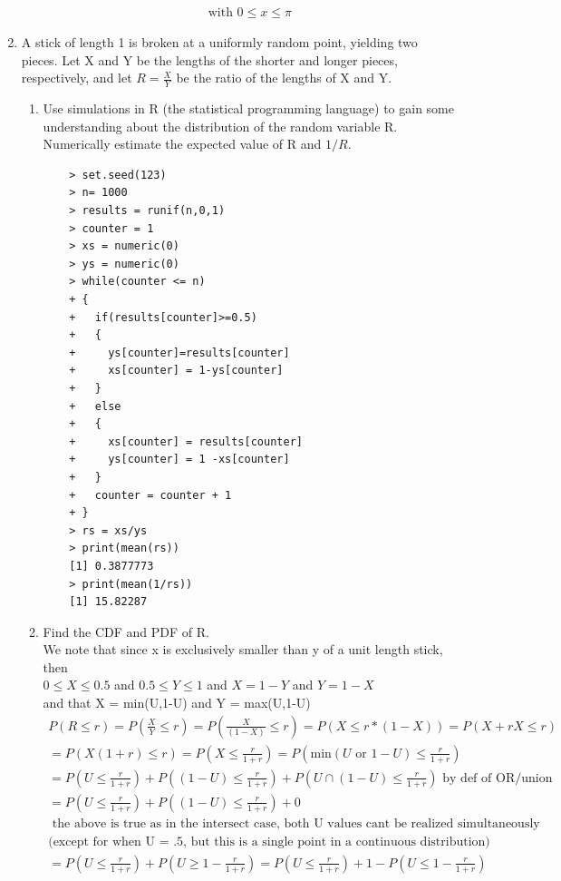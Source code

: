 \documentclass[11pt]{article}
\begin{document}
\begin{enumerate}
\begin{enumerate}
\begin{gather}
	\\
	\text{with } 0 \le x \le \pi
	\end{gather}
\end{enumerate}
\item A stick of length 1 is broken at a uniformly random point, yielding two pieces. Let X and Y be the lengths
of the shorter and longer pieces, respectively, and let $R = \frac{X}{Y}$ be the ratio of the lengths of X and Y.
\begin{enumerate}
	\item  Use simulations in R (the statistical programming language) to gain some understanding about the distribution of the random variable R. Numerically estimate the expected value of R and $1/R$.
	\begin{verbatim}
	> set.seed(123)
	> n= 1000
	> results = runif(n,0,1)
	> counter = 1
	> xs = numeric(0)
	> ys = numeric(0)
	> while(counter <= n)
	+ {
	+   if(results[counter]>=0.5)
	+   {
	+     ys[counter]=results[counter]
	+     xs[counter] = 1-ys[counter]
	+   }
	+   else
	+   {
	+     xs[counter] = results[counter]
	+     ys[counter] = 1 -xs[counter]
	+   }
	+   counter = counter + 1
	+ }
	> rs = xs/ys
	> print(mean(rs))
	[1] 0.3877773
	> print(mean(1/rs))
	[1] 15.82287
	\end{verbatim}
	\item Find the CDF and PDF of R.\\
	We note that since x is exclusively smaller than y of a unit length stick, then \\
	$0\le X \le 0.5$ and $0.5 \le Y \le 1$ and $X = 1-Y $ and $Y= 1-X$\\
	and that X = min(U,1-U) and Y = max(U,1-U)
	\begin{gather}
	P(R \le r) = P(\frac{X}{Y} \le r) =  P(\frac{X}{(1-X)} \le r) = P(X \le r*(1-X)) = P(X + rX \le r) \\
	= P(X(1+r) \le r) = P(X \le \frac{r}{1+r}) = P(\text{min}(U \text{ or }1-U) \le \frac{r}{1+r}) \\
	= P(U\le \frac{r}{1+r}) + P((1-U) \le \frac{r}{1+r}) + P(U\cap(1-U)\le \frac{r}{1+r}) \text{ by def of OR/union} \\
	= P(U\le \frac{r}{1+r}) + P((1-U) \le \frac{r}{1+r}) + 0 \\
	\text{ the above is true as in the intersect case, both U values cant be realized simultaneously}\\
	\text{(except for when U = .5, but this is a single point in a continuous distribution)}\\
	= P(U\le \frac{r}{1+r}) + P(U \ge 1 - \frac{r}{1+r} ) =  P(U\le \frac{r}{1+r}) + 1 - P(U \le 1 - \frac{r}{1+r} ) \\

\end{gather}
\end{enumerate}
\end{enumerate}
\end{document}
